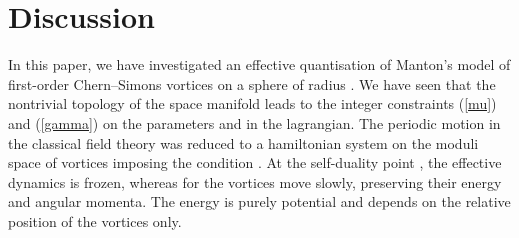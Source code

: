 \documentclass[a4paper,11pt]{article}
\begin{document}
\section{Discussion}


In this paper, we have investigated an effective quantisation of
Manton's model of first-order Chern--Simons vortices on a sphere 
\myHighlight{$\Sigma$}\coordHE{} of 
radius \coordHE{}. We have seen that the nontrivial topology of the space
manifold leads to the integer constraints (\ref{mu}) and (\ref{gamma})
on the parameters \myHighlight{$\gamma$}\coordHE{} and \myHighlight{$\mu$}\coordHE{} in the lagrangian.
The periodic motion in the classical field theory was reduced
to a hamiltonian system on the moduli space of \coordHE{} vortices
imposing the condition \myHighlight{$\gamma=\mu$}\coordHE{}. At the self-duality point 
\coordHE{}, the effective dynamics is frozen, whereas for 
\coordHE{} the vortices move
slowly, preserving their energy and angular momenta. The energy is purely 
potential and depends on the relative position of the vortices only.
\end{document}
